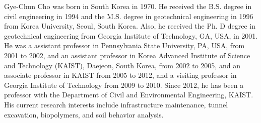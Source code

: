 \documentclass{ieeeaccess}
\begin{document}
\begin{IEEEbiography}{Gye-Chun Cho} was born in South Korea in 1970. He received the B.S. degree in civil engineering in 1994 and the M.S. degree in geotechnical engineering in 1996 from Korea University, Seoul, South Korea. Also, he received the Ph. D degree in geotechnical engineering from Georgia Institute of Technology, GA, USA, in 2001. He was a assistant professor in Pennsylvania State University, PA, USA, from 2001 to 2002, and an assistant professor in Korea Advanced Institute of Science and Technology (KAIST), Daejeon, South Korea, from 2002 to 2005, and an associate professor in KAIST from 2005 to 2012, and a visiting professor in Georgia Institute of Technology from 2009 to 2010. Since 2012, he has been a professor with the Department of Civil and Environmental Engineering, KAIST. His current research interests include infrastructure maintenance, tunnel excavation, biopolymers, and soil behavior analysis. 
\end{IEEEbiography}

\EOD
\end{document}
